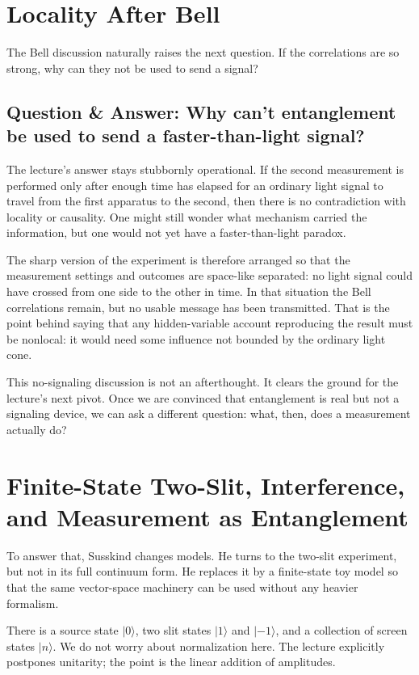 \section{Locality After Bell}

The Bell discussion naturally raises the next question. If the correlations are so strong, why can they not be used to send a signal?

\subsection{Question \& Answer: Why can’t entanglement be used to send a faster-than-light signal?}

The lecture's answer stays stubbornly operational. If the second measurement is performed only after enough time has elapsed for an ordinary light signal to travel from the first apparatus to the second, then there is no contradiction with locality or causality. One might still wonder what mechanism carried the information, but one would not yet have a faster-than-light paradox.

The sharp version of the experiment is therefore arranged so that the measurement settings and outcomes are space-like separated: no light signal could have crossed from one side to the other in time. In that situation the Bell correlations remain, but no usable message has been transmitted. That is the point behind saying that any hidden-variable account reproducing the result must be nonlocal: it would need some influence not bounded by the ordinary light cone.

This no-signaling discussion is not an afterthought. It clears the ground for the lecture's next pivot. Once we are convinced that entanglement is real but not a signaling device, we can ask a different question: what, then, does a measurement actually do?

\section{Finite-State Two-Slit, Interference, and Measurement as Entanglement}

To answer that, Susskind changes models. He turns to the two-slit experiment, but not in its full continuum form. He replaces it by a finite-state toy model so that the same vector-space machinery can be used without any heavier formalism.

There is a source state \(|0\rangle\), two slit states \(|1\rangle\) and \(|-1\rangle\), and a collection of screen states \(|n\rangle\). We do not worry about normalization here. The lecture explicitly postpones unitarity; the point is the linear addition of amplitudes.

